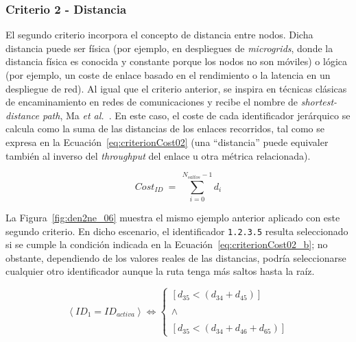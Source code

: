 \subsubsection{Criterio 2 - Distancia}

El segundo criterio incorpora el concepto de distancia entre nodos. Dicha distancia puede ser física (por ejemplo, en despliegues de \textit{microgrids}, donde la distancia física es conocida y constante porque los nodos no son móviles) o lógica (por ejemplo, un coste de enlace basado en el rendimiento o la latencia en un despliegue de red). Al igual que el criterio anterior, se inspira en técnicas clásicas de encaminamiento en redes de comunicaciones y recibe el nombre de \textit{shortest-distance path}, Ma \textit{et al.}~\cite{Ma97}. En este caso, el coste de cada identificador jerárquico se calcula como la suma de las distancias de los enlaces recorridos, tal como se expresa en la Ecuación~\ref{eq:criterionCost02} (una ``distancia'' puede equivaler también al inverso del \textit{throughput} del enlace u otra métrica relacionada).

\begin{equation}\label{eq:criterionCost02}
     Cost_{ID}  \: = \: \sum_{i=0}^{N_{saltos}-1} d_{i}
\end{equation}
\vspace{0.2cm}

La Figura~\ref{fig:den2ne_06} muestra el mismo ejemplo anterior aplicado con este segundo criterio. En dicho escenario, el identificador \texttt{1.2.3.5} resulta seleccionado si se cumple la condición indicada en la Ecuación~\ref{eq:criterionCost02_b}; no obstante, dependiendo de los valores reales de las distancias, podría seleccionarse cualquier otro identificador aunque la ruta tenga más saltos hasta la raíz.

\begin{equation}\label{eq:criterionCost02_b}
     \left \langle ID_{1} = ID_{activa} \right \rangle \Leftrightarrow 
     \left\{\begin{matrix}
      [d_{35} < ( d_{34} + d_{45})] \\
      \\
       \wedge \\ 
       \\
      [d_{35} < ( d_{34} + d_{46} + d_{65})] 
      \end{matrix}\right.
\end{equation}
\vspace{0.2cm}

